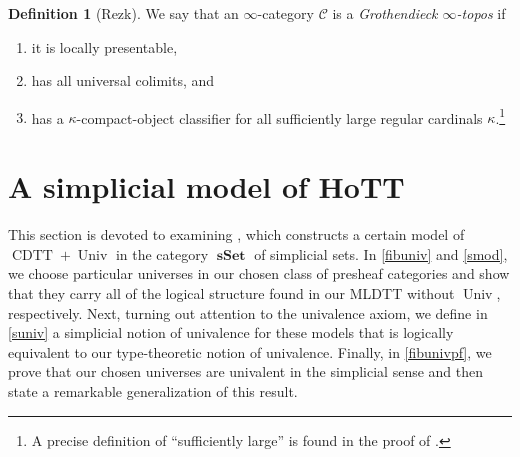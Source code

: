 \documentclass[10pt,letterpaper,cm]{nupset}
\theoremstyle{definition}
\newtheorem{definition}{Definition}[subsection]
\theoremstyle{theorem}
\theoremstyle{remark}
\newcommand{\0}{\mathbf{0}}
\newcommand{\1}{\mathbf{1}}
\newcommand{\2}{\mathbf{2}}
\DeclareMathOperator{\cdtt}{\mathrm{CDTT}}
\DeclareMathOperator{\univ}{\mathrm{Univ}}
\DeclareMathOperator{\op}{op}
\DeclareMathOperator{\sset}{\mathbf{sSet}}
\DeclareMathOperator{\set}{\mathbf{Set}}
\renewcommand{\c}{\mathscr{C}}
\newcommand{\be}{\begin{enumerate}}
\newcommand{\ee}{\end{enumerate}}
\begin{document}
\begin{definition}[Rezk]
We say that an $\infty$-category $\c$ is a \textit{Grothendieck $\infty$-topos}  if 
\be[label=(\roman*)]
\item it is locally presentable, 
\item has all universal colimits, and
\item has a $\kappa$-compact-object classifier for all sufficiently large regular cardinals $\kappa$.\footnote{A precise definition of ``sufficiently large'' is found in the proof of \cite[Proposition 6.1.6.7]{Lurie}.}
\ee
\end{definition}


\section{A simplicial model of HoTT}\label{models}

This section is devoted to examining \cite[Sections 2 and 3]{KL}, which constructs a certain model of $\cdtt  +\univ$ in the category $\sset$ of simplicial sets.
In \cref{fibuniv} and  \cref{smod}, we choose particular universes in our chosen class of presheaf categories and show that they carry all of the logical structure found in our MLDTT without $\univ$, respectively.  Next, turning out attention to the univalence axiom, we define in \cref{suniv} a simplicial notion of univalence for these models that is logically equivalent to our type-theoretic notion of univalence. Finally, in \cref{fibunivpf}, we prove that our chosen universes are univalent  in the simplicial sense and then state a remarkable generalization of this result.

\begin{comment}
This section is devoted to examining both \cite[Sections 2 and 3]{KL}  and \cite{Shul}. The former constructs a certain model of $\cdtt  +\univ$ in the category $\sset$ of simplicial sets. The latter uses this construction to show that $\cdtt  +\univ$ can be interpreted in the category of simplicial presheaves over any small elegant Reedy category $\c$. Since the trivial category $\ast$ is elegant Reedy (as will be evident) and $$\left[\ast^{\op}, \sset\right] \cong \left[\left(\ast \times \varDelta\right)^{\op}, \set\right] \cong \sset,$$  it follows that \cite{Shul} directly generalizes \cite{KL}. Even so, it will be sufficient to take \cite{KL}, on the one hand, as our main source for several key stages of \cite{Shul} as they have exact analogues in the setting of  $\mathbf{sSet}$. Such a setting is also instructive thanks to its familiarity and geometric flavor. On the other hand, we shall take \cite{Shul} as our main source for proving that the internal universe is fibrant since its methodology here is substantially different from that of  \cite{KL}.
\end{comment}
\end{document}

